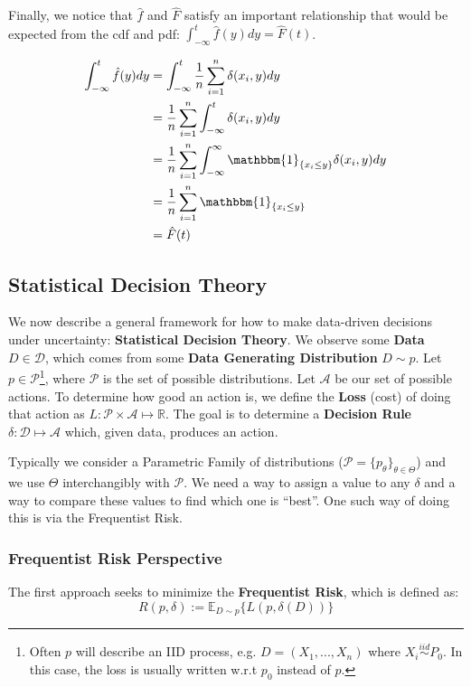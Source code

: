 \documentclass[]{article}
\theoremstyle{mattstyle}
\theoremstyle{definition}
\begin{document}
Finally, we notice that $\hat{f}$ and $\hat{F}$ satisfy an important relationship that would be expected from the cdf and pdf: $\int_{-\infty}^{t}\hat{f}(y)dy = \hat{F}(t)$.

\begin{align*}
\int_{-\infty}^{t}\hat{f}(y)dy &= \int_{-\infty}^{t} \frac{1}{n}\sum_{i=1}^n \delta(x_i, y)dy\\
&= \frac{1}{n}\sum_{i=1}^n \int_{-\infty}^{t}  \delta(x_i, y)dy\\
&= \frac{1}{n}\sum_{i=1}^n \int_{-\infty}^{\infty} \mathbbm{1}_{\{x_i \le y\}} \delta(x_i, y)dy\\
&= \frac{1}{n}\sum_{i=1}^n \mathbbm{1}_{\{x_i \le y\}}\\
&= \hat{F}(t)
\end{align*}

\newpage

\subsection{Statistical Decision Theory}\label{sec:dectheory}

We now describe a general framework for how to make data-driven decisions under uncertainty: \textbf{Statistical Decision Theory}. We observe some \textbf{Data} \(D \in \mathcal{D}\), which comes from some \textbf{Data Generating Distribution} \(D \sim p\). Let \(p\in \mathcal{P}\)\footnote{Often $p$ will describe an IID process, e.g. $D = (X_1,...,X_n)$ where $X_i \overset{iid}\sim P_0$. In this case, the loss is usually written w.r.t $p_0$ instead of $p$.}, where \(\mathcal{P}\) is the set of possible distributions. Let \(\mathcal{A}\) be our set of possible actions. To determine how good an action is, we define the \textbf{Loss} (cost) of doing that action as \(L: \mathcal{P} \times \mathcal{A} \mapsto \mathbb{R}\). The goal is to determine a \textbf{Decision Rule} \(\delta: \mathcal{D} \mapsto \mathcal{A}\) which, given data, produces an action.

Typically we consider a Parametric Family of distributions ($\mathcal{P} = \{p_{\theta}\}_{\theta\in\Theta}$) and we use \(\Theta\) interchangibly with \(\mathcal{P}\). We need a way to assign a value to any \(\delta\) and a way to compare these values to find which one is ``best''. One such way of doing this is via the Frequentist Risk.

\subsubsection{Frequentist Risk Perspective} 
The first approach seeks to minimize the \textbf{Frequentist Risk}, which is defined as:
\begin{equation}\label{eq:1}
R(p,\delta) := \mathbb{E}_{D\sim p}\{L(p,\delta(D))\}
\end{equation}
\end{document}
